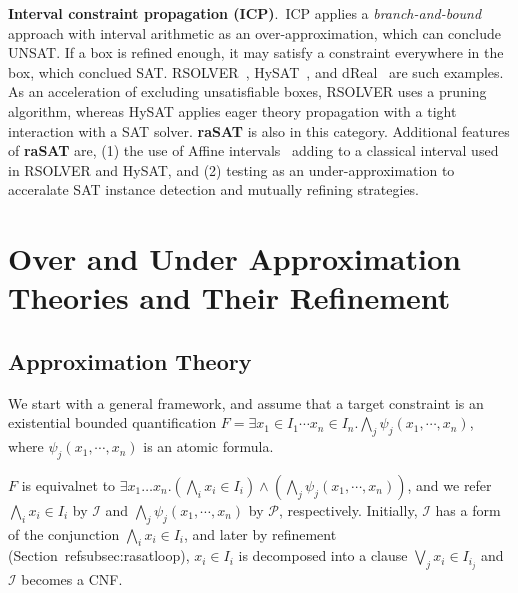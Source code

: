 \documentclass[runningheads,a4paper,oribibl]{llncs}
\newcommand{\mizuhito}[1]{\{{\bf Mizuhito:~\sf #1}\}} %
\begin{document}

\medskip \noindent
\textbf{Interval constraint propagation (ICP)}.~ICP applies a {\em branch-and-bound}
approach with interval arithmetic as an over-approximation, which can conclude UNSAT. 
If a box is refined enough, 
it may satisfy a constraint everywhere in the box, which conclued SAT. 
RSOLVER~\cite{rsolver}, HySAT~\cite{isat}, and dReal~\cite{dRealCADE13} are such examples. 
As an acceleration of excluding unsatisfiable boxes, RSOLVER uses a pruning algorithm, whereas 
HySAT applies eager theory propagation with a tight interaction with a SAT solver. 
{\bf raSAT} is also in this category. 
Additional features of {\bf raSAT} are, (1) the use of  Affine intervals~\cite{Stolfi03}
adding to a classical interval used in RSOLVER and HySAT, and 
(2) testing as an under-approximation to acceralate SAT instance detection and 
mutually refining strategies. 





\section{Over and Under Approximation Theories and Their Refinement}
\label{sec:raSATloop} 
\subsection{Approximation Theory}

We start with a general framework, and assume that a target constraint is 
an existential bounded quantification 
$F = \exists x_1 \in I_1 \cdots x_n \in I_n. \bigwedge \limits_j \psi_j(x_1,\cdots,x_n)$, 
where $\psi_j(x_1,\cdots,x_n)$ is an atomic formula. 

$F$ is equivalnet to 
$\exists x_1 \ldots x_n. (\bigwedge \limits_i x_i \in I_i) \wedge (\bigwedge \limits_j \psi_j(x_1,\cdots,x_n))$, 
and we refer $\bigwedge \limits_i x_i \in I_i$ by ${\mathcal I}$ and 
$\bigwedge \limits_j \psi_j(x_1,\cdots,x_n)$ by ${\mathcal P}$, 
respectively. 
Initially, ${\mathcal I}$ has a form of the conjunction $\bigwedge \limits_i x_i \in I_i$, and later by refinement
(Section~ref{subsec:rasatloop}), $x_i \in I_i$ is decomposed into a clause $\bigvee_j x_i \in I_{i_j}$
and ${\mathcal I}$ becomes a CNF. 
\end{document}
